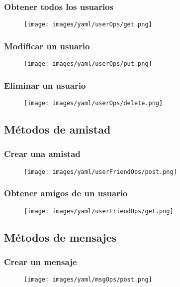 \documentclass[12pt,a4paper, spanish]{article}
\begin{document}
\subsubsection{Obtener todos los usuarios}
\begin{figure}[H]
	\centering
	\texttt{[image: images/yaml/userOps/get.png]}
\end{figure}
\subsubsection{Modificar un usuario}
\begin{figure}[H]
	\centering
	\texttt{[image: images/yaml/userOps/put.png]}
\end{figure}
\subsubsection{Eliminar un usuario}
\begin{figure}[H]
	\centering
	\texttt{[image: images/yaml/userOps/delete.png]}
\end{figure}

\newpage
\subsection{Métodos de amistad}
\subsubsection{Crear una amistad}
\begin{figure}[H]
	\centering
	\texttt{[image: images/yaml/userFriendOps/post.png]}
\end{figure}
\subsubsection{Obtener amigos de un usuario}
\begin{figure}[H]
	\centering
	\texttt{[image: images/yaml/userFriendOps/get.png]}
\end{figure}

\newpage
\subsection{Métodos de mensajes}
\subsubsection{Crear un mensaje}
\begin{figure}[H]
	\centering
	\texttt{[image: images/yaml/msgOps/post.png]}
\end{figure}
\end{document}
